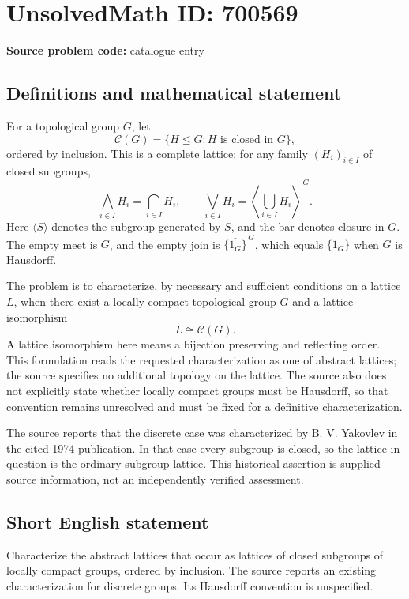 \documentclass[11pt]{article}
\begin{document}
\section*{UnsolvedMath ID: 700569}
\textbf{Source problem code:} catalogue entry
\subsection{Definitions and mathematical statement}
For a topological group \(G\), let
\[
\mathcal{C}(G)=\{H\leq G:H\text{ is closed in }G\},
\]
ordered by inclusion. This is a complete lattice: for any family \((H_i)_{i\in I}\) of closed subgroups,
\[
\bigwedge_{i\in I}H_i=\bigcap_{i\in I}H_i,
\qquad
\bigvee_{i\in I}H_i=\overline{\left\langle\bigcup_{i\in I}H_i\right\rangle}^{\,G}.
\]
Here \(\langle S\rangle\) denotes the subgroup generated by \(S\), and the bar denotes closure in \(G\). The empty meet is \(G\), and the empty join is \(\overline{\{1_G\}}^{\,G}\), which equals \(\{1_G\}\) when \(G\) is Hausdorff.

The problem is to characterize, by necessary and sufficient conditions on a lattice \(L\), when there exist a locally compact topological group \(G\) and a lattice isomorphism
\[
L\cong\mathcal{C}(G).
\]
A lattice isomorphism here means a bijection preserving and reflecting order. This formulation reads the requested characterization as one of abstract lattices; the source specifies no additional topology on the lattice. The source also does not explicitly state whether locally compact groups must be Hausdorff, so that convention remains unresolved and must be fixed for a definitive characterization.

The source reports that the discrete case was characterized by B. V. Yakovlev in the cited 1974 publication. In that case every subgroup is closed, so the lattice in question is the ordinary subgroup lattice. This historical assertion is supplied source information, not an independently verified assessment.
\subsection{Short English statement}
Characterize the abstract lattices that occur as lattices of closed subgroups of locally compact groups, ordered by inclusion. The source reports an existing characterization for discrete groups. Its Hausdorff convention is unspecified.
\end{document}
